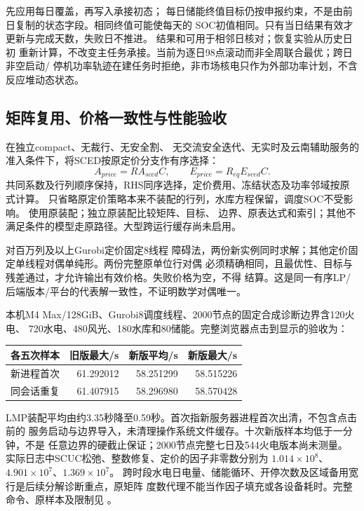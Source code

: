 先应用每日覆盖，再写入承接初态；
每日储能终值目标仍按申报约束，不是由前日复制的状态字段。相同终值可能使每天的
SOC初值相同。只有当日结果有效才更新与完成天数，失败日不推进。
结果和可用于相邻日核对；恢复实验从历史日初
重新计算，不改变主任务承接。当前为逐日98点滚动而非全周联合最优；跨日非空启动/
停机功率轨迹在建任务时拒绝，非市场核电只作为外部功率计划，不含反应堆动态状态。

\subsection{矩阵复用、价格一致性与性能验收}
在独立compact、无裁行、无安全割、
无交流安全迭代、无实时及云南辅助服务的准入条件下，将SCED按原定价分支作有序选择：
\begin{equation}
 A_{price}=R A_{sced} C,\qquad E_{price}=R_{eq}E_{sced}C.
\end{equation}
共同系数及行列顺序保持，RHS同序选择，定价费用、冻结状态及功率邻域按原式计算。
只省略原定价策略本来不装配的行列，水库方程保留，调度SOC不受影响。
使用原装配；独立原装配比较矩阵、目标、
边界、原表达式和索引；其他不满足条件的模型走原路径。大型跨运行缓存尚未启用。

对百万列及以上Gurobi定价固定8线程
障碍法，两份新实例同时求解；其他定价固定单线程对偶单纯形。两份完整原单位行对偶
必须精确相同，且最优性、目标与残差通过，才允许输出有效价格。失败价格为空，不得
结算。这是同一有序LP/后端版本/平台的代表解一致性，不证明数学对偶唯一。

本机M4 Max/128GiB、Gurobi8调度线程、2000节点的固定合成诊断边界含120火电、
720水电、480风光、180水库和80储能。完整浏览器点击到显示的验收为：
\begin{center}
\begin{tabular}{lrrr}
\toprule
各五次样本 & 旧版最大/s & 新版平均/s & 新版最大/s\\
\midrule
新进程首次 & 61.292012 & 58.251299 & 58.515226\\
同会话重复 & 61.407915 & 58.296980 & 58.570428\\
\bottomrule
\end{tabular}
\end{center}
LMP装配平均由约3.35秒降至0.59秒。首次指新服务器进程首次出清，不包含点击前的
服务启动与边界导入，未清理操作系统文件缓存。十次新版样本均低于一分钟，不是
任意边界的硬截止保证；2000节点完整七日及544火电版本尚未测量。
实际日志中SCUC松弛、整数修复、定价的因子非零数分别为
$1.014\times10^8$、$4.901\times10^7$、$1.369\times10^7$。
跨时段水电日电量、储能循环、开停次数及区域备用宽行是后续分解诊断重点，原矩阵
度数代理不能当作因子填充或各设备耗时。完整命令、原样本及限制见
。

